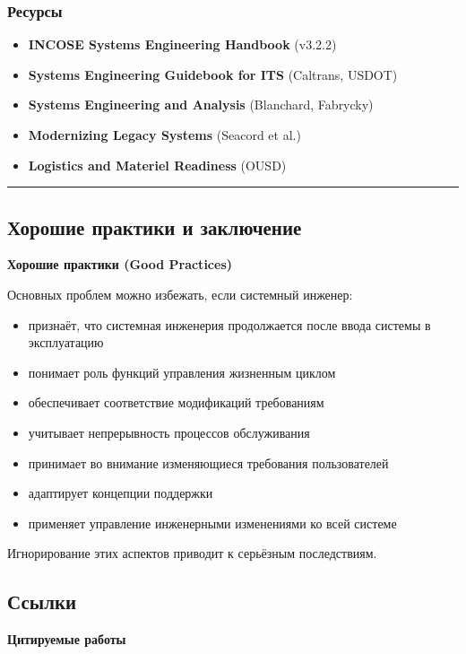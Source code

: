 \documentclass[14pt,a4paper]{extarticle}
\begin{document}
\subsubsection{Ресурсы}

\begin{itemize}
\item \textbf{INCOSE Systems Engineering Handbook} (v3.2.2)
\item \textbf{Systems Engineering Guidebook for ITS} (Caltrans, USDOT)
\item \textbf{Systems Engineering and Analysis} (Blanchard, Fabrycky)
\item \textbf{Modernizing Legacy Systems} (Seacord et al.)
\item \textbf{Logistics and Materiel Readiness} (OUSD)
\end{itemize}

\hrule

\subsection{Хорошие практики и заключение}

\textbf{Хорошие практики (Good Practices)}

Основных проблем можно избежать, если системный инженер:

\begin{itemize}
\item признаёт, что системная инженерия продолжается после ввода системы в эксплуатацию
\item понимает роль функций управления жизненным циклом
\item обеспечивает соответствие модификаций требованиям
\item учитывает непрерывность процессов обслуживания
\item принимает во внимание изменяющиеся требования пользователей
\item адаптирует концепции поддержки
\item применяет управление инженерными изменениями ко всей системе
\end{itemize}

Игнорирование этих аспектов приводит к серьёзным последствиям.

\subsection*{Ссылки}

\textbf{Цитируемые работы}
\end{document}
